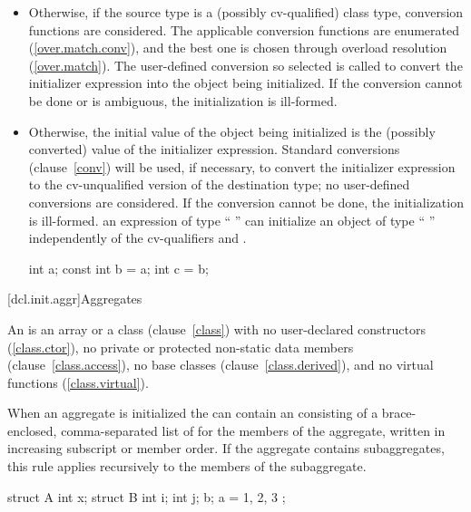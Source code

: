 \begin{itemize}
\item
Otherwise, if the source type
is a (possibly cv-qualified) class type, conversion functions are
considered.
The applicable conversion functions are enumerated
(\ref{over.match.conv}), and the best one is chosen through overload
resolution (\ref{over.match}).
The user-defined conversion so selected
is called to convert the initializer expression into the
object being initialized.
If the conversion cannot be done or is
ambiguous, the initialization is ill-formed.
\item
Otherwise, the initial value of the object being initialized is
the (possibly converted) value of the initializer expression.
Standard conversions (clause~\ref{conv}) will be used, if necessary,
to convert the initializer expression to the cv-unqualified version of
the destination type;
no user-defined conversions are considered.
If the conversion cannot
be done, the initialization is ill-formed.
%
\enternote
an expression of type
`` ''
can initialize an object of type
`` ''
independently of
the cv-qualifiers
and .

\begin{codeblock}
int a;
const int b = a;
int c = b;
\end{codeblock}
\exitnoteb
\end{itemize}

[dcl.init.aggr]{Aggregates}%
%
%
%
%
%
%

\pnum
An
is an array or a class (clause~\ref{class}) with no
user-declared constructors (\ref{class.ctor}),
no private or protected non-static data members (clause~\ref{class.access}),
no base classes (clause~\ref{class.derived}),
and no virtual functions (\ref{class.virtual}).

\pnum
When an aggregate is initialized the  can contain
an  consisting of a brace-enclosed,
comma-separated list of  for the
members of the aggregate, written in increasing subscript or member order.
If the aggregate contains subaggregates, this rule applies recursively
to the members of the subaggregate.
\enterexample
\begin{codeblock}
struct A {
	int x;
	struct B {
		int i;
		int j;
	} b;
} a = { 1, { 2, 3 } };
\end{codeblock}

